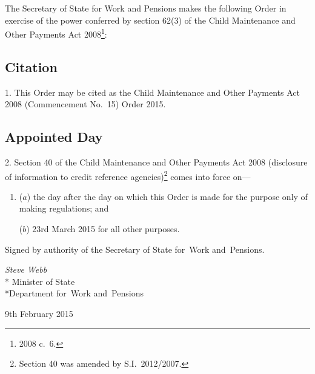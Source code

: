 \documentclass[12pt,a4paper]{article}
\title{\regstitle}
\author{S.I.\ 2015 No.\ 176 (C.~10)}
\date{Made
9th February 2015
}
\begin{document}
\maketitle


\noindent
The Secretary of State for Work and Pensions makes the following Order in exercise of the power conferred by section 62(3) of the Child Maintenance and Other Payments Act 2008\footnote{2008 c.~6.}: 

{\sloppy

\tableofcontents

}

\bigskip

\setcounter{secnumdepth}{-2}

\subsection[1. Citation]{Citation}

1.  This Order may be cited as the Child Maintenance and Other Payments Act 2008 (Commencement No.~15) Order 2015.

\subsection[2. Appointed Day]{Appointed Day}

2.  Section 40 of the Child Maintenance and Other Payments Act 2008 (disclosure of information to credit reference agencies)\footnote{Section 40 was amended by S.I.~2012/2007.} comes into force on—
\begin{enumerate}\item[]
($a$) the day after the day on which this Order is made for the purpose only of making regulations; and

($b$) 23rd March 2015 for all other purposes.
\end{enumerate}

\bigskip

\pagebreak[3]

Signed 
by authority of the 
Secretary of State for~Work and~Pensions.

{\raggedleft
\emph{Steve Webb}\\*
Minister
of State\\*Department 
for~Work and~Pensions

}

9th February 2015
\end{document}
